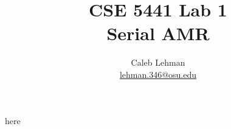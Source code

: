 \documentclass{article}
\title{
CSE 5441 Lab 1 \\
\large Serial AMR
}
\author{
Caleb Lehman \\
\href{mailto:lehman.346@osu.edu}{lehman.346@osu.edu}
}
\begin{document}
here
\end{document}
